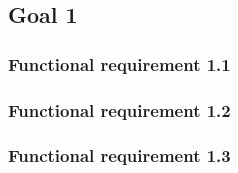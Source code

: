 \subsection{Goal 1}

\setcounter{secnumdepth}{3}
\subsubsection{Functional requirement 1.1}

\subsubsection{Functional requirement 1.2}

\subsubsection{Functional requirement 1.3}

